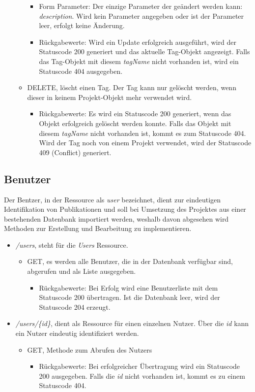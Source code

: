 \documentclass[12pt]{scrartcl}
\begin{document}
\begin{itemize}
\begin{itemize}
\begin{itemize}
			\item Form Parameter: Der einzige Parameter der geändert werden kann: \emph{description}. Wird kein Parameter angegeben oder ist der Parameter leer, erfolgt keine Änderung. 
			\item Rückgabewerte: Wird ein Update erfolgreich ausgeführt, wird der Statuscode 200 generiert und das aktuelle Tag-Objekt angezeigt. Falls das Tag-Objekt mit diesem \emph{tagName} nicht vorhanden ist, wird ein Statuscode 404 ausgegeben.  
		\end{itemize} 
		\item DELETE, löscht einen Tag. Der Tag kann nur gelöscht werden, wenn dieser in keinem Projekt-Objekt mehr verwendet wird.
		\begin{itemize}
			\item Rückgabewerte: Es wird ein Statuscode 200 generiert, wenn das Objekt erfolgreich gelöscht werden konnte. Falls das Objekt mit diesem \emph{tagName} nicht vorhanden ist, kommt es zum Statuscode 404. Wird der Tag noch von einem Projekt verwendet, wird der Statuscode 409 (Conflict) generiert.
		\end{itemize}
	\end{itemize} 	
\end{itemize}
\subsection{Benutzer}
Der Bentzer, in der Ressource als \emph{user} bezeichnet, dient zur eindeutigen Identifikation von Publikationen und soll bei Umsetzung des Projektes aus einer bestehenden Datenbank importiert werden, weshalb davon abgesehen wird Methoden zur Erstellung und Bearbeitung zu implementieren.
\begin{itemize}
	\item \emph{/users}, steht für die \emph{Users} Ressource. 
	\begin{itemize}
		\item GET, es werden alle Benutzer, die in der Datenbank verfügbar sind, abgerufen und als Liste ausgegeben.
		\begin{itemize}
			\item Rückgabewerte: Bei Erfolg wird eine Benutzerliste mit dem Statuscode 200 übertragen. Ist die Datenbank leer, wird der Statuscode 204 erzeugt.
		\end{itemize} 
	\end{itemize}
	\item \emph{ /users/\{id\}}, dient als Ressource für einen einzelnen Nutzer. Über die \emph{id} kann ein Nutzer eindeutig identifiziert werden. 
	\begin{itemize}
		\item GET, Methode zum Abrufen des Nutzers
		\begin{itemize}
			\item Rückgabewerte: Bei erfolgreicher Übertragung wird ein Statuscode 200 ausgegeben. Falls die \emph{id} nicht vorhanden ist, kommt es zu einem Statuscode 404.
		\end{itemize} 
	\end{itemize}
\end{itemize}
\end{document}
